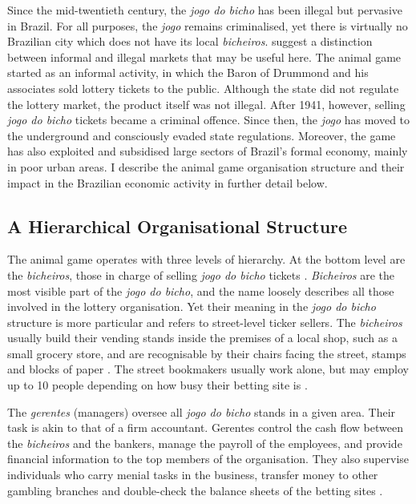 \documentclass[a4paper,12pt]{article}
\begin{document}
Since the mid-twentieth century, the \textit{jogo do bicho} has been illegal but pervasive in Brazil. For all purposes, the \textit{jogo} remains criminalised, yet there is virtually no Brazilian city which does not have its local \textit{bicheiros}. \citet{cross2006risk} suggest a distinction between informal and illegal markets that may be useful here. The animal game started as an informal activity, in which the Baron of Drummond and his associates sold lottery tickets to the public. Although the state did not regulate the lottery market, the product itself was not illegal. After 1941, however, selling \textit{jogo do bicho} tickets became a criminal offence. Since then, the \textit{jogo} has moved to the underground and consciously evaded state regulations. Moreover, the game has also exploited and subsidised large sectors of Brazil's formal economy, mainly in poor urban areas. I describe the animal game organisation structure and their impact in the Brazilian economic activity in further detail below.  

\subsection{A Hierarchical Organisational Structure}%
\label{sub:organisation}

The animal game operates with three levels of hierarchy. At the bottom level are the \textit{bicheiros}, those in charge of selling \textit{jogo do bicho} tickets \citep{chazkel2007beyond, da1999aguias}. \textit{Bicheiros} are the most visible part of the \textit{jogo do bicho}, and the name loosely describes all those involved in the lottery organisation. Yet their meaning in the \textit{jogo do bicho} structure is more particular and refers to street-level ticker sellers. The \textit{bicheiros}  usually build their vending stands inside the premises of a local shop, such as a small grocery store, and are recognisable by their chairs facing the street, stamps and blocks of paper \citep[259]{chazkel2011laws}. The street bookmakers usually work alone, but may employ up to 10 people depending on how busy their betting site is \citep[69]{labronici2014sorteio}.

The \textit{gerentes} (managers) oversee all \textit{jogo do bicho} stands in a given area. Their task is akin to that of a firm accountant. Gerentes control the cash flow between the \textit{bicheiros} and the bankers, manage the payroll of the employees, and provide financial information to the top members of the organisation. They also supervise individuals who carry menial tasks in the business, transfer money to other gambling branches and double-check the balance sheets of the betting sites \citetext{\citealp[71]{labronici2012paratodos}; \citealp[142]{misse2007illegal}}.
\end{document}
